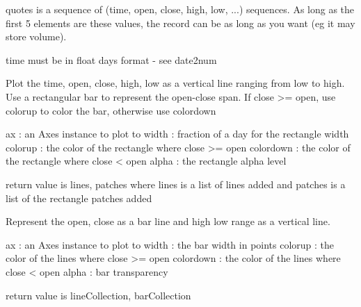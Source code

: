 \documentclass[letterpaper,10pt,english]{sphinxmanual}
\begin{document}
\begin{fulllineitems}
\label{newfinance:newfinance.candlestick}
quotes is a sequence of (time, open, close, high, low, ...) sequences.
As long as the first 5 elements are these values,
the record can be as long as you want (eg it may store volume).

time must be in float days format - see date2num

Plot the time, open, close, high, low as a vertical line ranging
from low to high.  Use a rectangular bar to represent the
open-close span.  If close \textgreater{}= open, use colorup to color the bar,
otherwise use colordown

ax          : an Axes instance to plot to
width       : fraction of a day for the rectangle width
colorup     : the color of the rectangle where close \textgreater{}= open
colordown   : the color of the rectangle where close \textless{}  open
alpha       : the rectangle alpha level

return value is lines, patches where lines is a list of lines
added and patches is a list of the rectangle patches added

\end{fulllineitems}


\begin{fulllineitems}
\label{newfinance:newfinance.candlestick2}
Represent the open, close as a bar line and high low range as a
vertical line.

ax          : an Axes instance to plot to
width       : the bar width in points
colorup     : the color of the lines where close \textgreater{}= open
colordown   : the color of the lines where close \textless{}  open
alpha       : bar transparency

return value is lineCollection, barCollection

\end{fulllineitems}

\end{document}
